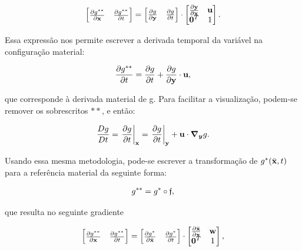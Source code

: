 \documentclass[tese_patricia]{subfiles}%
\begin{document}
\begin{align}
	\begin{bmatrix}
		\frac{\partial {g^{**}}}{\partial {\mathbf{x}}} & \frac{\partial {g^{**}}}{\partial t} \\
	\end{bmatrix}
	=
	\begin{bmatrix}
		\frac{\partial {g}}{\partial \mathbf{y}} & \frac{\partial {g}}{\partial t} 
	\end{bmatrix}
	\cdot
	\begin{bmatrix}
		\frac{\partial {\mathbf{y}}}{\partial {\mathbf{x}}} & \mathbf{u} \\
		\mathbf{0}^T & 1 \\
	\end{bmatrix} .
\end{align}

Essa expressão nos permite escrever a derivada temporal da variável na configuração material:

\begin{align}
	\frac{\partial g^{**}}{\partial t} = \frac{\partial g}{\partial t} + \frac{\partial g}{\partial \mathbf{y}} \cdot \mathbf{u}, 
\end{align}

\noindent que corresponde à derivada material de g. Para facilitar a visualização, podem-se remover os sobrescritos $**$, e então:

\begin{align}
	\frac{Dg}{Dt} = \left . \frac{\partial g}{\partial t} \right|_{\mathbf{x}} = \left . \frac{\partial g}{\partial t} \right|_{\mathbf{y}} + \mathbf{u} \cdot \boldsymbol{\nabla_y} g. \label{eq:der_mat}
\end{align}

Usando essa mesma metodologia, pode-se escrever a transformação de $g^{*}(\bar{\mathbf{x}},t)$ para a referência material da seguinte forma:


\begin{align}
	g^{**} = g^{*}  \circ \mathfrak{f},
\end{align}

\noindent que resulta no seguinte gradiente

\begin{align}
	\begin{bmatrix}
		\frac{\partial {g^{**}}}{\partial {\mathbf{x}}} & \frac{\partial {g^{**}}}{\partial t} \\
	\end{bmatrix}
	=
	\begin{bmatrix}
		\frac{\partial {g^*}}{\partial \bar{\mathbf{x}}} & \frac{\partial {g^*}}{\partial t} 
	\end{bmatrix}
	\cdot
	\begin{bmatrix}
		\frac{\partial {\bar{\mathbf{x}}}}{\partial {\mathbf{x}}} & \mathbf{w} \\
		\mathbf{0}^T & 1 \\
	\end{bmatrix},
\end{align}
\end{document}
